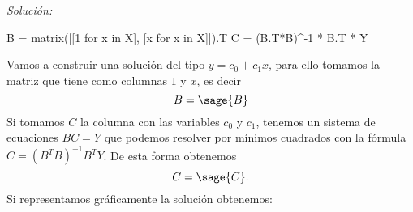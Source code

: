 \documentclass{amsart}
\begin{document}
{\it Solución:}


\begin{sageblock}
B = matrix([[1 for x in X],
            [x for x in X]]).T
C = (B.T*B)^-1 * B.T * Y
\end{sageblock}

Vamos a construir una solución del tipo $y = c_0 + c_1 x$, para ello tomamos
la matriz que tiene como columnas $1$ y $x$, es decir
$$ B = \sage{B} $$
Si tomamos $C$ la columna con las variables $c_0$ y $c_1$, tenemos un sistema 
de ecuaciones $B C = Y$ que podemos resolver por mínimos cuadrados con la fórmula
$C = (B^T B)^{-1} B^T Y$. De esta forma obtenemos 
$$ C = \sage{C}.$$
Si representamos gráficamente la solución obtenemos:

\begin{sagesub}
\begin{center}
\end{center}
\end{sagesub}

\end{document}
